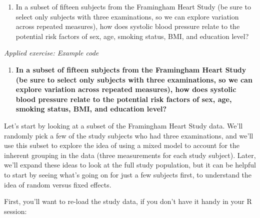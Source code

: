 \documentclass[
]{book}
\newenvironment{Shaded}{\begin{snugshade}}{\end{snugshade}}
\newcommand{\CommentTok}[1]{\textcolor[rgb]{0.56,0.35,0.01}{\textit{#1}}}
\newcommand{\KeywordTok}[1]{\textcolor[rgb]{0.13,0.29,0.53}{\textbf{#1}}}
\newcommand{\NormalTok}[1]{#1}
\newcommand{\OperatorTok}[1]{\textcolor[rgb]{0.81,0.36,0.00}{\textbf{#1}}}
\newcommand{\StringTok}[1]{\textcolor[rgb]{0.31,0.60,0.02}{#1}}
\providecommand{\tightlist}{%
  \setlength{\itemsep}{0pt}\setlength{\parskip}{0pt}}
\begin{document}
\begin{enumerate}
\def\labelenumi{\arabic{enumi}.}
\tightlist
\item
  In a subset of fifteen subjects from the Framingham Heart Study (be sure
  to select only subjects with three examinations, so we can explore variation
  across repeated measures), how does systolic blood pressure relate to the
  potential risk factors of sex, age, smoking status, BMI, and education level?
\end{enumerate}

\emph{Applied exercise: Example code}

\begin{enumerate}
\def\labelenumi{\arabic{enumi}.}
\tightlist
\item
  \textbf{In a subset of fifteen subjects from the Framingham Heart Study (be sure
  to select only subjects with three examinations, so we can explore variation
  across repeated measures), how does systolic blood pressure relate to the
  potential risk factors of sex, age, smoking status, BMI, and education level?}
\end{enumerate}

Let's start by looking at a subset of the Framingham Heart Study data. We'll
randomly pick a few of the study subjects who had three examinations, and
we'll use this subset to explore the idea of using a mixed model to account
for the inherent grouping in the data (three measurements for each study
subject). Later, we'll expand these ideas to look at the full study population,
but it can be helpful to start by seeing what's going on for just a few subjects
first, to understand the idea of random versus fixed effects.

First, you'll want to re-load the study data, if you don't have it handy in
your R session:

\begin{Shaded}
\end{Shaded}
\end{document}
